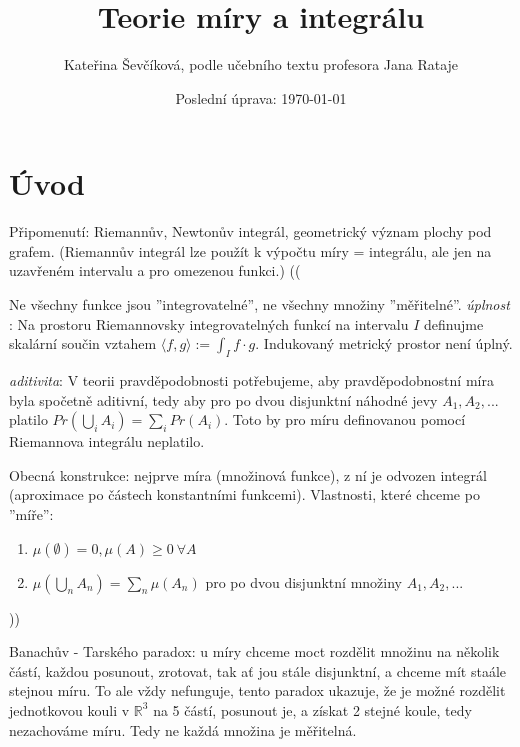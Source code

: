 \documentclass{article}
\title{Teorie míry a integrálu}
\author{Kateřina Ševčíková, podle učebního textu profesora Jana Rataje}
\date{Poslední úprava: \today}
\theoremstyle{definition}
\begin{document}
\maketitle

\tableofcontents
\newpage

\section*{Úvod}
Připomenutí: Riemannův, Newtonův integrál, geometrický význam plochy pod
grafem. (Riemannův integrál lze použít k výpočtu míry = integrálu, ale jen na 
uzavřeném intervalu a pro omezenou funkci.)
(( 

Ne všechny funkce jsou ”integrovatelné”, ne všechny množiny ”měřitelné”.
\textit{úplnost} :  Na  prostoru  Riemannovsky  integrovatelných  funkcí  na  intervalu  \(I\) 
definujme skalární součin vztahem   \( \langle f, g\rangle    :=   \int _I  f \cdot g \). 
Indukovaný metrický prostor není úplný.

\textit{aditivita}: V teorii pravděpodobnosti potřebujeme, aby pravděpodobnostní míra  
byla  spočetně aditivní,  tedy  aby  pro  po  dvou  disjunktní  náhodné jevy \(A_1, A_2, . . .\) 
platilo \(Pr(\bigcup _i A_i) = \sum_i Pr(A_i)\).
Toto by pro míru definovanou pomocí Riemannova integrálu neplatilo.

Obecná konstrukce: nejprve  míra (množinová  funkce), z ní  je  odvozen  integrál (aproximace po částech konstantními funkcemi).
Vlastnosti, které chceme po ”míře”:
\begin{enumerate}
    \item \( \mu (\emptyset) = 0, \mu(A) \geq 0 \ \forall A \)
    \item \(\mu(\bigcup _n A_n) = \sum _n \mu(A_n)\) pro po dvou disjunktní množiny \(A_1, A_2, ... \)
\end{enumerate}

 ))

Banachův - Tarského paradox: u míry chceme moct rozdělit množinu na několik částí, 
každou posunout, zrotovat, tak ať jou stále disjunktní, a chceme mít staále stejnou míru.
To ale vždy nefunguje, tento paradox ukazuje, že je možné rozdělit jednotkovou kouli v \(\mathbb{R}^3\) 
na 5 částí, posunout je, a získat 2 stejné koule, tedy nezachováme míru.
Tedy ne každá množina je měřitelná.
\end{document}
